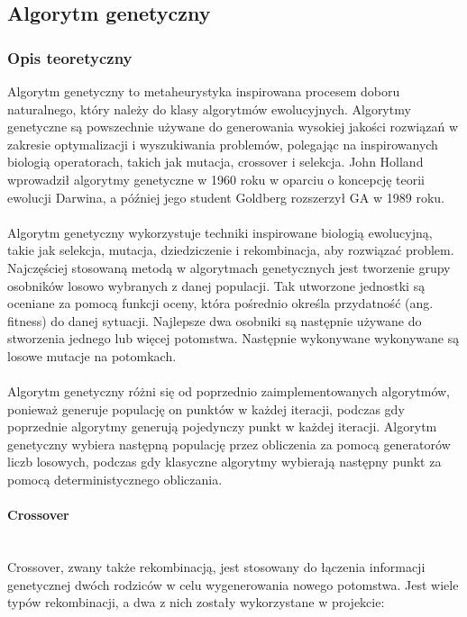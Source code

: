 \documentclass[12pt,a4paper,titlepage]{article}
\begin{document}
\subsection{Algorytm genetyczny}
\subsubsection{Opis teoretyczny}
Algorytm genetyczny to metaheurystyka inspirowana procesem doboru naturalnego, który należy do klasy algorytmów ewolucyjnych. Algorytmy genetyczne są powszechnie używane do generowania wysokiej jakości rozwiązań w zakresie optymalizacji i wyszukiwania problemów, polegając na inspirowanych biologią operatorach, takich jak mutacja, crossover i selekcja. John Holland wprowadził algorytmy genetyczne w 1960 roku w oparciu o koncepcję teorii ewolucji Darwina, a później jego student Goldberg rozszerzył GA w 1989 roku.\cite{wiki_ga}\\\\
Algorytm genetyczny wykorzystuje techniki inspirowane biologią ewolucyjną, takie jak selekcja, mutacja, dziedziczenie i rekombinacja, aby rozwiązać problem. Najczęściej stosowaną metodą w algorytmach genetycznych jest tworzenie grupy osobników losowo wybranych z danej populacji. Tak utworzone jednostki są oceniane za pomocą funkcji oceny, która pośrednio określa przydatność (ang. fitness) do danej sytuacji.
Najlepsze dwa osobniki są następnie używane do stworzenia jednego lub więcej potomstwa. Następnie wykonywane wykonywane są losowe mutacje na potomkach.\\\\
Algorytm genetyczny różni się od poprzednio zaimplementowanych algorytmów, ponieważ generuje populację on punktów w każdej iteracji, podczas gdy poprzednie algorytmy generują pojedynczy punkt w każdej iteracji. Algorytm genetyczny wybiera następną populację przez obliczenia za pomocą generatorów liczb losowych, podczas gdy klasyczne algorytmy wybierają następny punkt za pomocą deterministycznego obliczania.

\paragraph{Crossover}\mbox{}\\
Crossover, zwany także rekombinacją, jest stosowany do łączenia informacji genetycznej dwóch rodziców w celu wygenerowania nowego potomstwa. Jest wiele typów rekombinacji, a dwa z nich zostały wykorzystane w projekcie:
\end{document}
